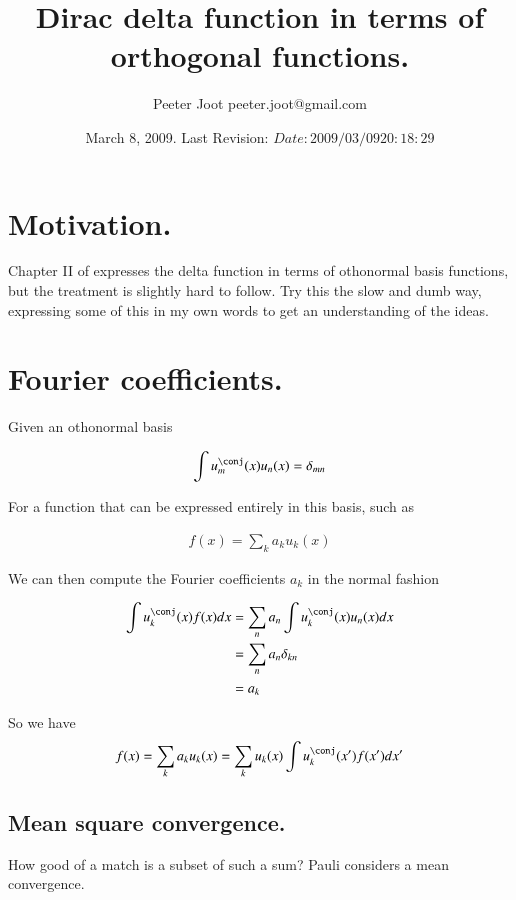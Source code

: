 \documentclass{article}
\title{ Dirac delta function in terms of orthogonal functions. }
\author{Peeter Joot \quad peeter.joot@gmail.com }
\date{ March 8, 2009.  Last Revision: $Date: 2009/03/09 20:18:29 $ }
\begin{document}
\maketitle{}

\section{ Motivation. }

Chapter II of \cite{pauli2000wm} expresses the delta function in terms of othonormal basis functions, but the treatment is slightly
hard to follow.  Try this the slow and dumb way, expressing some of this in my own words to get an understanding of the ideas.

\section{ Fourier coefficients. }

Given an othonormal basis 

\begin{align*}
\int u_m^\conj(x) u_n(x) = \delta_{mn}
\end{align*}

For a function that can be expressed entirely in this basis, such as

\begin{align*}
f(x) = \sum_k a_k u_k(x)
\end{align*}

We can then compute the Fourier coefficients $a_k$ in the normal fashion

\begin{align*}
\int u_k^\conj(x) f(x) dx 
&= \sum_n a_n \int u_k^\conj(x) u_n(x) dx \\
&= \sum_n a_n \delta_{kn} \\
&= a_k \\
\end{align*}

So we have 
\begin{align*}
f(x) = \sum_k a_k u_k(x)  = \sum_k u_k(x) \int u_k^\conj(x') f(x') dx'
\end{align*}

\subsection{ Mean square convergence. }

How good of a match is a subset of such a sum?  Pauli considers a mean convergence.
\end{document}
